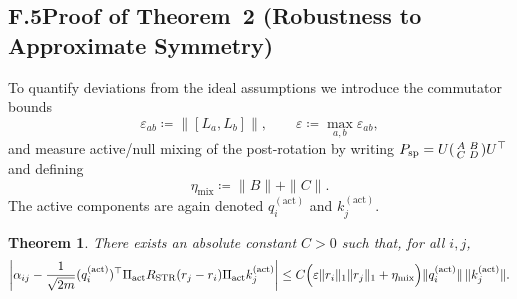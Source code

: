 \documentclass[11pt]{article}
\newtheorem{theorem}{Theorem}
\begin{document}
\subsection*{F.5\quad Proof of Theorem~2 (Robustness to Approximate Symmetry)}

To quantify deviations from the ideal assumptions we introduce the commutator bounds
\begin{equation}
  \varepsilon_{ab} \coloneqq \bigl\|[L_a,L_b]\bigr\|,
  \qquad
  \varepsilon \coloneqq \max_{a,b} \varepsilon_{ab},
  \label{eq:appendix-epsilon}
\end{equation}
and measure active/null mixing of the post-rotation by writing
$P_{\mathrm{sp}} = U \begin{psmallmatrix} A & B\\ C & D \end{psmallmatrix} U^\top$ and defining
\begin{equation}
  \eta_{\mathrm{mix}} \coloneqq \|B\| + \|C\|.
  \label{eq:appendix-eta-mix}
\end{equation}
The active components are again denoted $q_i^{(\mathrm{act})}$ and $k_j^{(\mathrm{act})}$.

\begin{theorem}\label{thm:appendix-robust-logits}
There exists an absolute constant $C>0$ such that, for all $i,j$,
\begin{equation}
  \left|\alpha_{ij}
    - \frac{1}{\sqrt{2m}}
      (q_i^{(\mathrm{act})})^\top
      \Pi_{\mathrm{act}} R_{\mathrm{STR}}(r_j - r_i) \Pi_{\mathrm{act}}
      k_j^{(\mathrm{act})}\right|
  \le
  C\Bigl(\varepsilon \|r_i\|_1 \|r_j\|_1 + \eta_{\mathrm{mix}}\Bigr)
    \|q_i^{(\mathrm{act})}\|\,\|k_j^{(\mathrm{act})}\|.
  \label{eq:appendix-robust-bound}
\end{equation}
\end{theorem}
\end{document}
